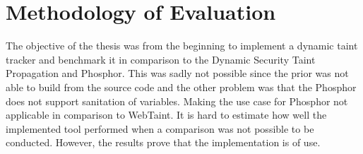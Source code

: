 \section{Methodology of Evaluation}
\label{methev}
The objective of the thesis was from the beginning to implement a dynamic taint tracker and benchmark it in comparison to the Dynamic Security Taint Propagation and Phosphor. This was sadly not possible since the prior was not able to build from the source code and the other problem was that the Phosphor does not support sanitation of variables. Making the use case for Phosphor not applicable in comparison to WebTaint. It is hard to estimate how well the implemented tool performed when a comparison was not possible to be conducted. However, the results prove that the implementation is of use.